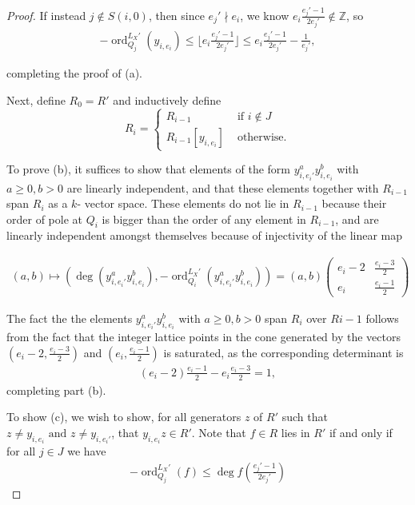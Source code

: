 \documentclass{amsart}
\theoremstyle{plain}
\theoremstyle{definition}
\theoremstyle{remark}
\numberwithin{equation}{section}
\newcommand\BZ{{\mathbb Z}}
\DeclareMathOperator{\ord}{ord}
\newcommand \subhalf[1]{\frac{{#1} - 1}{2{#1}}}
\newcommand \halfcan{L}
\begin{document}
\begin{proof}
If instead $j \notin S(i,0)$, then since $e_j' \nmid e_i$, we know
$e_i\subhalf{e_j'} \notin \BZ$, so
\begin{align*}
	-\ord_{Q_j}
^{\halfcan_X'}(y_{i, e_i}) \leq \lfloor  e_i\subhalf{e_j'} \rfloor 
	\leq e_i\subhalf{e_j'} - \frac{1}{e_j'},
\end{align*}

\noindent
completing the proof of (a).

Next, define $R_0 = R'$ and inductively define 
$$R_i = \begin{cases}
	R_{i - 1} &\text{ if }i \notin J\\
	R_{i - 1}[y_{i, e_i}] &\text{ otherwise.} 
\end{cases}$$

\noindent
To prove (b), it suffices to show that elements of the form $y_{i, e_
i'}^ay_{i, e_i}^b$ with $a \geq 0, b > 0$ are linearly independent,
and that these elements together with $R_{i - 1}$ span $R_i$ as a $k$-
vector space. These elements do not lie in $R_{i - 1}$ because their
order of pole at $Q_i$ is bigger than the order of any element in $R
_{i - 1}$, and are linearly independent amongst themselves because of
injectivity of the linear map

\begin{align*}
	(a,b) \mapsto \left( \deg\left(y_{i, e_i'}^ay_{i, e_i}^b\right),-
	\ord_{Q_i}
^{\halfcan_X'}\left( y_{i, e_i'}^ay_{i, e_i}^b \right)  \right) = (a,b) 
	\begin{pmatrix}
		e_i -2 & \frac{e_i -3}{2} \\
		e_i	 & \frac{e_i - 1}{2}
	\end{pmatrix} 
\end{align*}

\noindent
The fact the the elements $y_{i, e_i'}^a y_{i, e_i}^b$ with $a \geq 0,
b > 0$ span $R_i$ over $R{i - 1}$ follows from the fact that the
integer lattice points in the cone generated by the vectors $\left(e
_i -2, \frac{e_i -3}{2} \right)$ and $\left(e_i, \frac{e_i - 1}{2}
\right)$ is saturated, as the corresponding determinant is
\begin{align*}
	(e_i -2) \frac{e_i - 1}{2} - e_i \frac{e_i -3}{2} = 1,
\end{align*}
completing part (b).

To show (c), we wish to show, for all generators $z$ of $R'$
such that $z \neq y_{i, e_i} \text{ and } z \neq y_{i, e_i'}$, that
$y_{i, e_i}z \in R'$. Note that $f \in R$ lies in $R'$ if and
only if for all $j \in J$ we have
\begin{align}
\label{eqn:order-degree}
	-\ord_{Q_j}
^{\halfcan_X'}(f) \leq \deg f \left( \subhalf {e_j'} \right) 
\end{align}


\end{proof}
\end{document}
